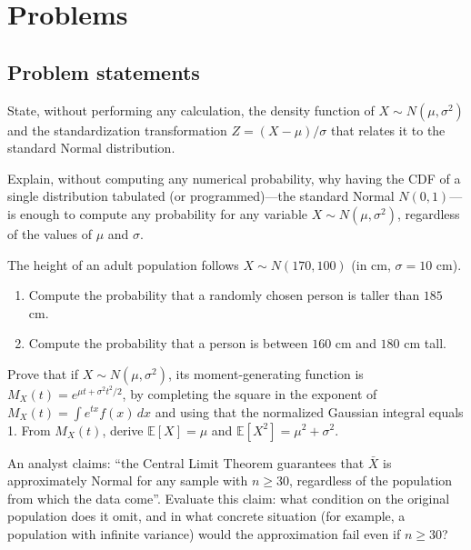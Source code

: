 \section*{Problems}

\subsection*{Problem statements}

\begin{problema}
	\label{prob:6f58870}
	State, without performing any calculation, the density function of $X \sim N(\mu,\sigma^2)$ and the standardization transformation $Z=(X-\mu)/\sigma$ that relates it to the standard Normal distribution.
\end{problema}

\begin{problema}
	\label{prob:74e7285}
	Explain, without computing any numerical probability, why having the CDF of a single distribution tabulated (or programmed)---the standard Normal $N(0,1)$---is enough to compute any probability for any variable $X \sim N(\mu,\sigma^2)$, regardless of the values of $\mu$ and $\sigma$.
\end{problema}

\begin{problema}
	\label{prob:48f2103}
	The height of an adult population follows $X \sim N(170, 100)$ (in cm, $\sigma=10$ cm).
	\begin{enumerate}
		\item Compute the probability that a randomly chosen person is taller than $185$ cm.
		\item Compute the probability that a person is between $160$ cm and $180$ cm tall.
	\end{enumerate}
\end{problema}

\begin{problema}
	\label{prob:dd1e027}
	Prove that if $X \sim N(\mu,\sigma^2)$, its moment-generating function is $M_X(t) = e^{\mu t + \sigma^2t^2/2}$, by completing the square in the exponent of $M_X(t) = \int e^{tx}f(x)\,dx$ and using that the normalized Gaussian integral equals 1. From $M_X(t)$, derive $\mathbb{E}[X]=\mu$ and $\mathbb{E}[X^2]=\mu^2+\sigma^2$.
\end{problema}

\begin{problema}
	\label{prob:96d8f57}
	An analyst claims: ``the Central Limit Theorem guarantees that $\bar{X}$ is approximately Normal for any sample with $n\ge30$, regardless of the population from which the data come''. Evaluate this claim: what condition on the original population does it omit, and in what concrete situation (for example, a population with infinite variance) would the approximation fail even if $n\ge30$?
\end{problema}

